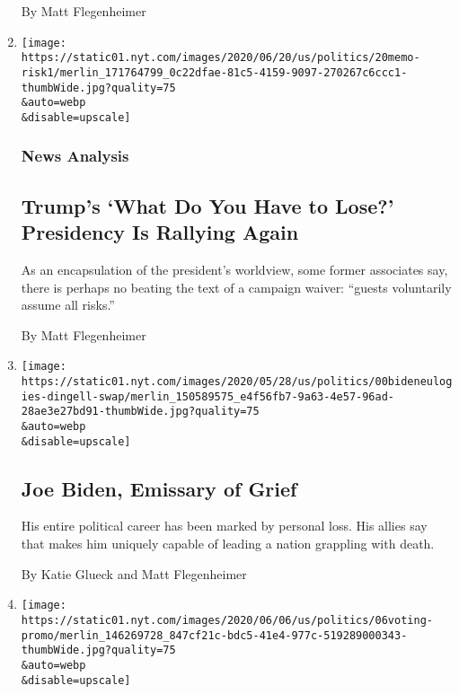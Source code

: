 \begin{enumerate}
  By Matt Flegenheimer
\item
  \href{/2020/06/20/us/politics/trump-campaign-rally-tulsa.html}{}

  \texttt{[image: https://static01.nyt.com/images/2020/06/20/us/politics/20memo-risk1/merlin\_171764799\_0c22dfae-81c5-4159-9097-270267c6ccc1-thumbWide.jpg?quality=75\\\&auto=webp\\\&disable=upscale]}

  \hypertarget{news-analysis}{%
  \subsubsection{News Analysis}\label{news-analysis}}

  \hypertarget{trumps-what-do-you-have-to-lose-presidency-is-rallying-again}{%
  \subsection{Trump's `What Do You Have to Lose?' Presidency Is Rallying
  Again}\label{trumps-what-do-you-have-to-lose-presidency-is-rallying-again}}

  As an encapsulation of the president's worldview, some former
  associates say, there is perhaps no beating the text of a campaign
  waiver: ``guests voluntarily assume all risks.''

  By Matt Flegenheimer
\item
  \href{/2020/06/11/us/politics/joe-biden-funeral-speech.html}{}

  \texttt{[image: https://static01.nyt.com/images/2020/05/28/us/politics/00bideneulogies-dingell-swap/merlin\_150589575\_e4f56fb7-9a63-4e57-96ad-28ae3e27bd91-thumbWide.jpg?quality=75\\\&auto=webp\\\&disable=upscale]}

  \hypertarget{joe-biden-emissary-of-grief}{%
  \subsection{Joe Biden, Emissary of
  Grief}\label{joe-biden-emissary-of-grief}}

  His entire political career has been marked by personal loss. His
  allies say that makes him uniquely capable of leading a nation
  grappling with death.

  By Katie Glueck and Matt Flegenheimer
\item
  \href{/2020/06/06/us/politics/protests-voting.html}{}

  \texttt{[image: https://static01.nyt.com/images/2020/06/06/us/politics/06voting-promo/merlin\_146269728\_847cf21c-bdc5-41e4-977c-519289000343-thumbWide.jpg?quality=75\\\&auto=webp\\\&disable=upscale]}


\end{enumerate}
